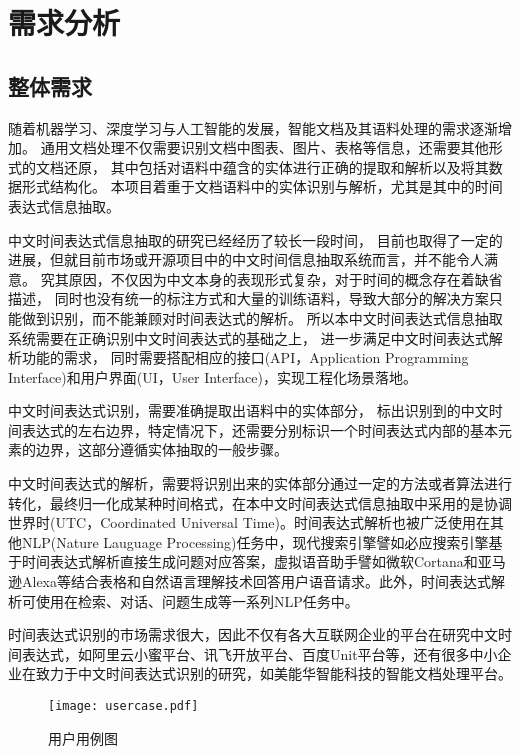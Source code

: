 
\chapter{需求分析}

\section{整体需求}

随着机器学习、深度学习与人工智能的发展，智能文档及其语料处理的需求逐渐增加。
通用文档处理不仅需要识别文档中图表、图片、表格等信息，还需要其他形式的文档还原，
其中包括对语料中蕴含的实体进行正确的提取和解析以及将其数据形式结构化。
本项目着重于文档语料中的实体识别与解析，尤其是其中的时间表达式信息抽取。

中文时间表达式信息抽取的研究已经经历了较长一段时间，
目前也取得了一定的进展，但就目前市场或开源项目中的中文时间信息抽取系统而言，并不能令人满意。
究其原因，不仅因为中文本身的表现形式复杂，对于时间的概念存在着缺省描述，
同时也没有统一的标注方式和大量的训练语料，导致大部分的解决方案只能做到识别，而不能兼顾对时间表达式的解析。
所以本中文时间表达式信息抽取系统需要在正确识别中文时间表达式的基础之上，
进一步满足中文时间表达式解析功能的需求，
同时需要搭配相应的接口(API，Application Programming Interface)和用户界面(UI，User Interface)，实现工程化场景落地。

中文时间表达式识别，需要准确提取出语料中的实体部分，
标出识别到的中文时间表达式的左右边界，特定情况下，还需要分别标识一个时间表达式内部的基本元素的边界，这部分遵循实体抽取的一般步骤。

中文时间表达式的解析，需要将识别出来的实体部分通过一定的方法或者算法进行转化，最终归一化成某种时间格式，在本中文时间表达式信息抽取中采用的是协调世界时(UTC，Coordinated Universal Time)。时间表达式解析也被广泛使用在其他NLP(Nature Lauguage Processing)任务中，现代搜索引擎譬如必应搜索引擎基于时间表达式解析直接生成问题对应答案，虚拟语音助手譬如微软Cortana和亚马逊Alexa等结合表格和自然语言理解技术回答用户语音请求。此外，时间表达式解析可使用在检索、对话、问题生成等一系列NLP任务中。

时间表达式识别的市场需求很大，因此不仅有各大互联网企业的平台在研究中文时间表达式，如阿里云小蜜平台、讯飞开放平台、百度Unit平台等，还有很多中小企业在致力于中文时间表达式识别的研究，如美能华智能科技的智能文档处理平台。

\begin{figure}[h]
    \centering
    \texttt{[image: usercase.pdf]}
    \caption{用户用例图}
    \label{fig:usecase}
\end{figure}

